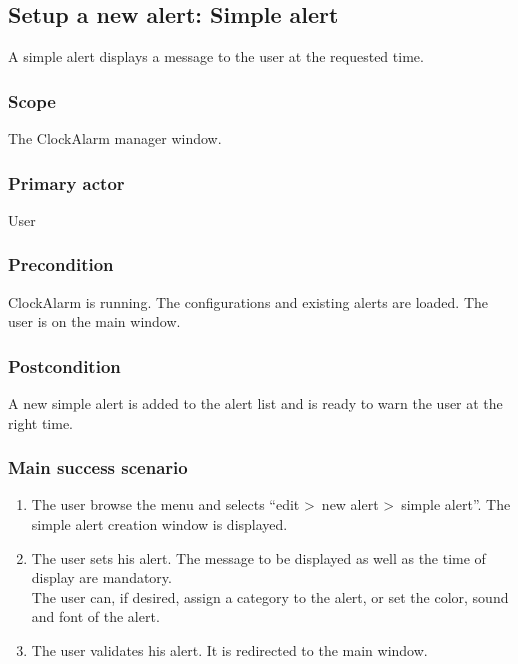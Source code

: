 \subsection{Setup a new alert: Simple alert}
A simple alert displays a message to the user at the requested time.
\subsubsection{Scope}
The ClockAlarm manager window.
\subsubsection{Primary actor}
User
\subsubsection{Precondition}
ClockAlarm is running. The configurations and existing alerts are loaded. The user is on the main window.
\subsubsection{Postcondition}
A new simple alert is added to the alert list and is ready to warn the user at the right time.
\subsubsection{Main success scenario}
\begin{enumerate}
	\item The user browse the menu and selects ``edit \textgreater~new alert \textgreater~simple alert''. The simple alert creation window is displayed. 
	\item\label{itm:ucaa_enter_sa} The user sets his alert. The message to be displayed as well as the time of display are mandatory. \\The user can, if desired, assign a category to the alert, or set the color, sound and font of the alert.
	\item\label{itm:ucaa_validate_sa} The user validates his alert. It is redirected to the main window.
\end{enumerate}
